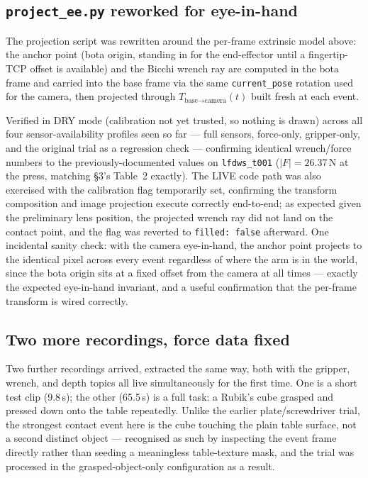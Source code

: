\documentclass[11pt]{article}
\begin{document}
\subsection{\texttt{project\_ee.py} reworked for eye-in-hand}

The projection script was rewritten around the per-frame extrinsic model
above: the anchor point (bota origin, standing in for the end-effector until
a fingertip-TCP offset is available) and the Bicchi wrench ray are computed
in the bota frame and carried into the base frame via the same
\texttt{current\_pose} rotation used for the camera, then projected through
$T_{\text{base}\to\text{camera}}(t)$ built fresh at each event.

Verified in DRY mode (calibration not yet trusted, so nothing is drawn)
across all four sensor-availability profiles seen so far --- full sensors,
force-only, gripper-only, and the original trial as a regression check ---
confirming identical wrench/force numbers to the previously-documented
values on \texttt{lfdws\_t001} ($|F|=26.37$\,N at the press, matching
\S3's Table~2 exactly). The LIVE code path was also exercised with the
calibration flag temporarily set, confirming the transform composition and
image projection execute correctly end-to-end; as expected given the
preliminary lens position, the projected wrench ray did not land on the
contact point, and the flag was reverted to \texttt{filled: false}
afterward. One incidental sanity check: with the camera eye-in-hand, the
anchor point projects to the identical pixel across every event regardless
of where the arm is in the world, since the bota origin sits at a fixed
offset from the camera at all times --- exactly the expected eye-in-hand
invariant, and a useful confirmation that the per-frame transform is wired
correctly.

\subsection{Two more recordings, force data fixed}

Two further recordings arrived, extracted the same way, both with the
gripper, wrench, and depth topics all live simultaneously for the first
time. One is a short test clip (9.8\,s); the other (65.5\,s) is a full task:
a Rubik's cube grasped and pressed down onto the table repeatedly. Unlike
the earlier plate/screwdriver trial, the strongest contact event here is
the cube touching the plain table surface, not a second distinct object ---
recognised as such by inspecting the event frame directly rather than
seeding a meaningless table-texture mask, and the trial was processed in
the grasped-object-only configuration as a result.
\end{document}
